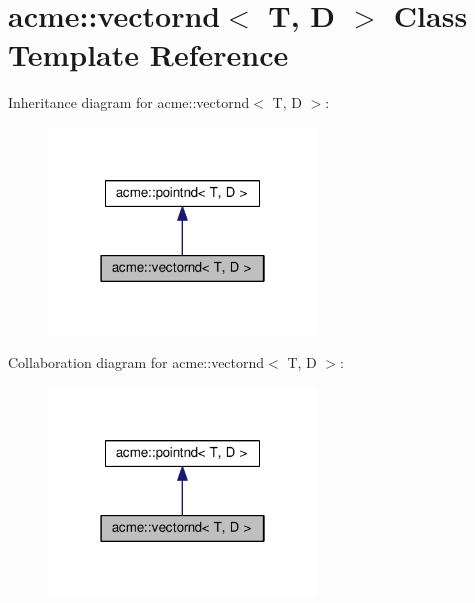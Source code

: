 \hypertarget{classacme_1_1vectornd}{}\section{acme\+:\+:vectornd$<$ T, D $>$ Class Template Reference}
\label{classacme_1_1vectornd}


Inheritance diagram for acme\+:\+:vectornd$<$ T, D $>$\+:
\nopagebreak
\begin{figure}[H]
\begin{center}
\leavevmode
\includegraphics[width=202pt]{dc/df5/classacme_1_1vectornd__inherit__graph}
\end{center}
\end{figure}


Collaboration diagram for acme\+:\+:vectornd$<$ T, D $>$\+:
\nopagebreak
\begin{figure}[H]
\begin{center}
\leavevmode
\includegraphics[width=202pt]{d8/d02/classacme_1_1vectornd__coll__graph}
\end{center}
\end{figure}
